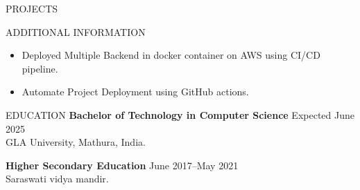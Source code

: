 \documentclass{resume}
\begin{document}
\begin{rSection}{PROJECTS}
\begin{itemize}
     
 \end{itemize}


\end{rSection}

\begin{rSection}{ADDITIONAL INFORMATION}
\begin{itemize}
  \itemsep -5pt {}
  \item Deployed Multiple Backend in docker container on AWS using CI/CD pipeline.
  \item Automate Project Deployment using GitHub actions.
\end{itemize}
\end{rSection}

\begin{rSection}{EDUCATION}
{\bf Bachelor of Technology in Computer Science} \hfill {Expected June 2025}\\
GLA University, Mathura, India.

{\bf Higher Secondary Education} \hfill {June 2017–May 2021}\\
Saraswati vidya mandir.
\end{rSection}
\end{document}
